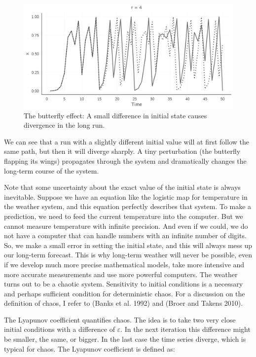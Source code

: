 \documentclass[
  a4paper,
  DIV=11,
  numbers=noendperiod]{scrreprt}
\begin{document}
\begin{figure}

{\centering \includegraphics{media/ch2/fig-ch2-img6.jpg}

}

\caption{\label{fig-ch2-img6}The butterfly effect: A small difference in
initial state causes divergence in the long run.}

\end{figure}

We can see that a run with a slightly different initial value will at
first follow the same path, but then it will diverge sharply. A tiny
perturbation (the butterfly flapping its wings) propagates through the
system and dramatically changes the long-term course of the system.

Note that some uncertainty about the exact value of the initial state is
always inevitable. Suppose we have an equation like the logistic map for
temperature in the weather system, and this equation perfectly describes
that system. To make a prediction, we need to feed the current
temperature into the computer. But we cannot measure temperature with
infinite precision. And even if we could, we do not have a computer that
can handle numbers with an infinite number of digits. So, we make a
small error in setting the initial state, and this will always mess up
our long-term forecast. This is why long-term weather will never be
possible, even if we develop much more precise mathematical models, take
more intensive and more accurate measurements and use more powerful
computers. The weather turns out to be a chaotic system. Sensitivity to
initial conditions is a necessary and perhaps sufficient condition for
deterministic chaos. For a discussion on the definition of chaos, I
refer to (Banks et al. 1992) and (Broer and Takens 2010).

The Lyapunov coefficient quantifies chaos. The idea is to take two very
close initial conditions with a difference of \(\varepsilon\). In the
next iteration this difference might be smaller, the same, or bigger. In
the last case the time series diverge, which is typical for chaos. The
Lyapunov coefficient is defined as:
\end{document}
